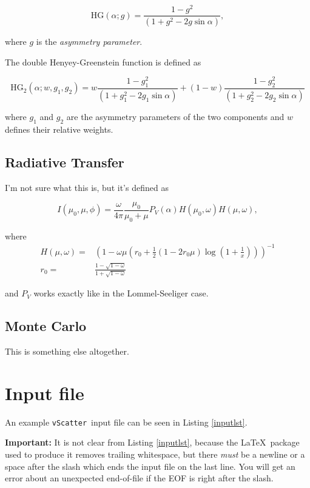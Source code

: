\documentclass[a4paper]{article}
\newcommand{\this}[0]{\texttt{vScatter}}
\begin{document}
\[
	\text{HG}(\alpha ; g) = \frac{1 - g^2}{(1 + g^2 - 2 g \sin \alpha)},
\]

where $g$ is the \emph{asymmetry parameter}.

The double Henyey-Greenstein function is defined as 

\[
	\text{HG}_2(\alpha ; w, g_1, g_2) = w \frac{1 - g_1^2}{(1 + g_1^2 - 2 g_1 \sin \alpha)}
	+ (1-w) \frac{1 - g_2^2}{(1 + g_2^2 - 2 g_2 \sin \alpha)}
\]

where $g_1$ and $g_2$ are the asymmetry parameters of the two components and $w$ defines their relative weights.


\subsection{Radiative Transfer}

I'm not sure what this is, but it's defined as 

\[
	I(\mu_0, \mu, \phi) = \frac{\omega}{4 \pi} \frac{\mu_0}{\mu_0 + \mu} P_V(\alpha) H(\mu_0, \omega) H(\mu, \omega),
\]

where 
\begin{align}
H(\mu, \omega) =& \left( 1 - \omega \mu \left(r_0 + \frac{1}{2} \left(1 - 2 r_0 \mu \right) \log \left(1 + \frac{1}{x} \right)\right) \right)^{-1} \\
r_0 =& \frac{1-\sqrt{1- \omega}}{1+\sqrt{1- \omega}}
\end{align}

and $P_V$ works exactly like in the Lommel-Seeliger case.

\subsection{Monte Carlo}

This is something else altogether.



\section{Input file}\label{input}

An example \this~input file can be seen in Listing \ref{inputlst}.

\textbf{Important:} It is not clear from Listing \ref{inputlst}, because the \LaTeX~package used to produce it removes trailing whitespace, but there \emph{must} be a newline or a space after the slash which ends the input file on the last line. You will get an error about an unexpected end-of-file if the EOF is right after the slash.
\end{document}

